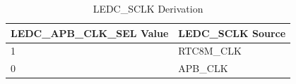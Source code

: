 
   \begin{longtable}[c]{ |p{5cm}|p{4.5cm}| } \caption{LEDC\_SCLK Derivation}
    \label{table:led_sclk}
        \hline
        \rowcolor{lightgray}
        LEDC\_APB\_CLK\_SEL Value & LEDC\_SCLK Source  \\
        \hline
        1 & RTC8M\_CLK \\
        \hline
        0 & APB\_CLK \\
        \hline
    \end{longtable}
